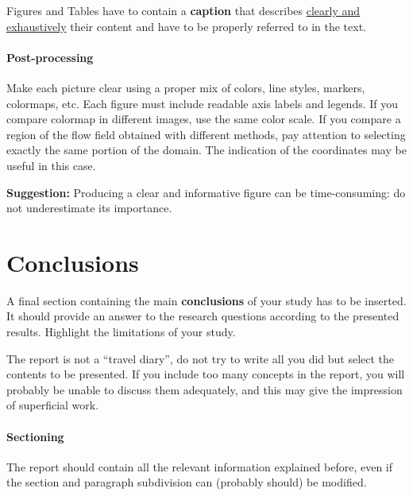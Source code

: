 \documentclass[11pt,a4paper]{article}
\begin{document}
Figures and Tables have to contain a \textbf{caption} that describes \underline{clearly and exhaustively} their content and have to be properly referred to in the text.


\paragraph{Post-processing} Make each picture clear using a proper mix of colors, line styles, markers, colormaps, etc. Each figure must include readable axis labels and legends. If you compare colormap in different images, use the same color scale.
If you compare a region of the flow field obtained with different methods, pay attention to selecting exactly the same portion of the domain. The indication of the coordinates may be useful in this case.

\textbf{Suggestion:} Producing a clear and informative figure can be time-consuming: do not underestimate its importance.


\section{Conclusions}
A final section containing the main \textbf{conclusions} of your study has to be inserted. It should provide an answer to the research questions according to the presented results. Highlight the limitations of your study.

The report is not a ``travel diary'', do not try to write all you did but select the contents to be presented. If you include too many concepts in the report, you will probably be unable to discuss them adequately, and this may give the impression of superficial work.

\paragraph{Sectioning}
The report should contain all the relevant information explained before, even if the section and paragraph subdivision can (probably should) be modified. 
\end{document}
